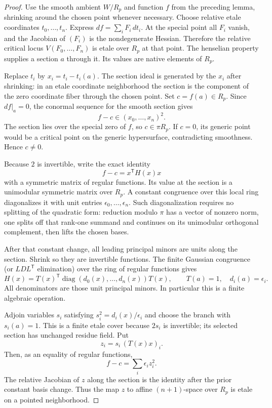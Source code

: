 \begin{proof}
Use the smooth ambient $W/R_p$ and function $f$ from
the preceding lemma, shrinking around the chosen point
whenever necessary. Choose relative etale coordinates
$t_0,\ldots,t_n$. Express
$df=\sum_i F_i\,dt_i$. At the special point all $F_i$
vanish, and the Jacobian of $(F_i)$ is the nondegenerate
Hessian. Therefore the relative critical locus
$V(F_0,\ldots,F_n)$ is etale over $R_p$ at that point.
The henselian property supplies a section $a$ through
it. Its values are native elements of $R_p$.

Replace $t_i$ by $x_i=t_i-t_i(a)$.
The section ideal is generated by the $x_i$ after
shrinking: in an etale coordinate neighborhood the
section is the component of the zero coordinate fiber
through the chosen point. Set $c=f(a)\in R_p$.
Since $df|_a=0$, the conormal sequence for the smooth
section gives
\[
                   f-c\in (x_0,\ldots,x_n)^2.
 \tag{ON17.3}\label{r17on:quadratic-ideal}
\]
The section lies over the special zero of $f$, so
$c\in\pi R_p$. If $c=0$, its generic point would
be a critical point on the generic hypersurface,
contradicting smoothness. Hence $c\ne0$.

Because $2$ is invertible, write the exact identity
\[
                      f-c=x^{\mathsf T}H(x)x
\]
with a symmetric matrix of regular functions.
Its value at the section is a unimodular symmetric
matrix over $R_p$. A constant congruence over this
local ring diagonalizes it with unit entries
$\epsilon_0,\ldots,\epsilon_n$. Such diagonalization
requires no splitting of the quadratic form: reduction
modulo $\pi$ has a vector of nonzero norm, one splits
off that rank-one summand and continues on its
unimodular orthogonal complement, then lifts the
chosen bases.

After that constant change, all leading principal
minors are units along the section. Shrink so they
are invertible functions. The finite Gaussian
congruence (or $LDL^{\mathsf T}$ elimination) over
the ring of regular functions gives
\[
     H(x)=T(x)^{\mathsf T}
          \operatorname{diag}(d_0(x),\ldots,d_n(x))T(x),
 \qquad T(a)=1,\quad d_i(a)=\epsilon_i.
 \tag{ON17.4}\label{r17on:ldl}
\]
All denominators are those unit principal minors.
In particular this is a finite algebraic operation.

Adjoin variables $s_i$ satisfying
$s_i^2=d_i(x)/\epsilon_i$ and choose the branch with
$s_i(a)=1$. This is a finite etale cover because
$2s_i$ is invertible; its selected section has
unchanged residue field. Put
\[
                  z_i=s_i\,(T(x)x)_i.
 \tag{ON17.5}\label{r17on:new-coordinates}
\]
Then, as an equality of regular functions,
\[
                   f-c=\sum_i\epsilon_i z_i^2.
 \tag{ON17.6}\label{r17on:identity}
\]
The relative Jacobian of $z$ along the section is
the identity after the prior constant basis change.
Thus the map $z$ to affine $(n+1)$-space over $R_p$
is etale on a pointed neighborhood.


\end{proof}
